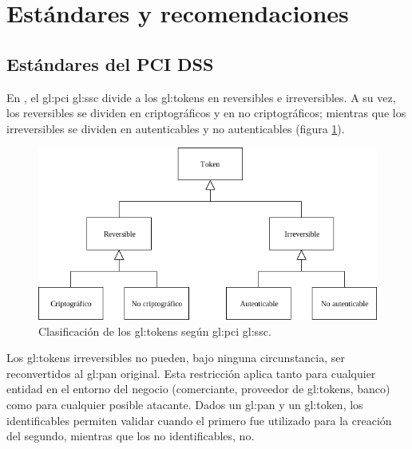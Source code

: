 %
%

\section{Estándares y recomendaciones}
\label{sec:estandares}

\subsection{Estándares del PCI DSS}

En \cite{pci_tokens}, el \gls{gl:pci} \gls{gl:ssc} divide a los
\glspl{gl:token} en reversibles e irreversibles. A su vez, los reversibles se
dividen en criptográficos y en no criptográficos; mientras que los
irreversibles se dividen en autenticables y no autenticables (figura
\ref{fig:division_tokens}).

\begin{figure}
  \begin{center}
    \includegraphics[width=0.75\linewidth]{diagramas/clasificacion.png}
    \caption{Clasificación de los \glspl{gl:token}
      según \gls{gl:pci} \gls{gl:ssc}.}
    \label{fig:division_tokens}
  \end{center}
\end{figure}

Los \glspl{gl:token} irreversibles no pueden, bajo ninguna circunstancia, ser
reconvertidos al \gls{gl:pan} original. Esta restricción aplica tanto para
cualquier entidad en el entorno del negocio (comerciante, proveedor de
\glspl{gl:token}, banco) como para cualquier posible atacante. Dados un
\gls{gl:pan} y un \gls{gl:token}, los identificables permiten validar cuando el
primero fue utilizado para la creación del segundo, mientras que los no
identificables, no.


